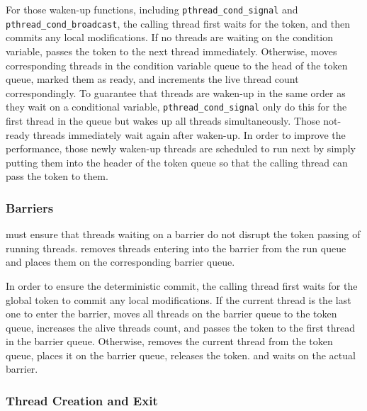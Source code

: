 For those waken-up functions, including \texttt{pthread\_cond\_signal} and \texttt{pthread\_cond\_broadcast}, the calling thread first waits for the token, and then commits any local modifications. If no threads are waiting on the condition variable, \dthreads{} passes the token to the next thread immediately. Otherwise, \dthreads{} moves corresponding threads in the condition variable queue to the head of the token queue, marked them as ready, and increments the live thread count correspondingly. To guarantee that threads are waken-up in the same order as they wait on a conditional variable, \texttt{pthread\_cond\_signal} only do this for the first thread in the queue but \dthreads{} wakes up all threads simultaneously. Those not-ready threads immediately wait again after waken-up. In order to improve the performance, those newly waken-up threads are scheduled to run next by simply putting them into the header of the token queue so that the calling thread can pass the token to them. 


\subsubsection{Barriers}

\label{sec:barrierwait}

\dthreads{} must ensure that threads waiting on a barrier do not disrupt the token passing of running threads. \dthreads{} removes threads entering into the barrier from the run queue and places them on the corresponding barrier queue.

In order to ensure the deterministic commit, the calling thread first waits for the global token to commit any local modifications. If the current thread is the last one to enter the barrier, \dthreads{} moves all threads on the barrier queue to the token queue, increases the alive threads count, and passes the token to the first thread in the barrier queue.  Otherwise, \dthreads{} removes the current thread from the token queue, places it on the barrier queue, releases the token. and waits on the actual barrier.


\subsubsection{Thread Creation and Exit}

\label{sec:threadcreation}

